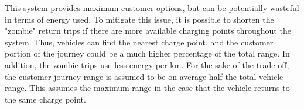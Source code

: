 This system provides maximum customer options, but can be potentially wasteful in terms of energy used. To mitigate this issue, it is possible to shorten the "zombie" return trips if there are more available charging points throughout the system. Thus, vehicles can find the nearest charge point, and the customer portion of the journey could be a much higher percentage of the total range. In addition, the zombie trips use less energy per km. For the sake of the trade-off, the customer journey range is assumed to be on average half the total vehicle range. This assumes the maximum range in the case that the vehicle returns to the same charge point.















